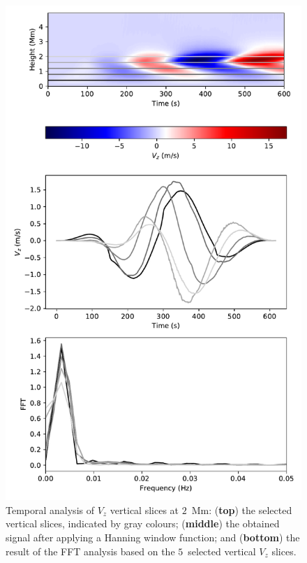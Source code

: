 \documentclass[physics,article,accept,pdftex,moreauthors]{Definitions/mdpi}
\begin{document}
\begin{figure}[H]
    \includegraphics[width=9%
.5cm]{fft_sim2.pdf}
    \caption{Temporal analysis of $V_{z}$ vertical slices at $2$~{Mm:} {({\bf top})} %
 the selected vertical slices, indicated by gray {colours;  ({\bf middle})} %
 the obtained signal after applying a Hanning 
window {function; and ({\bf bottom})} %
the result of the FFT analysis based on the $5$~selected vertical $V_{z}$ slices.
\label{fig11}}

\end{figure}
\end{document}

